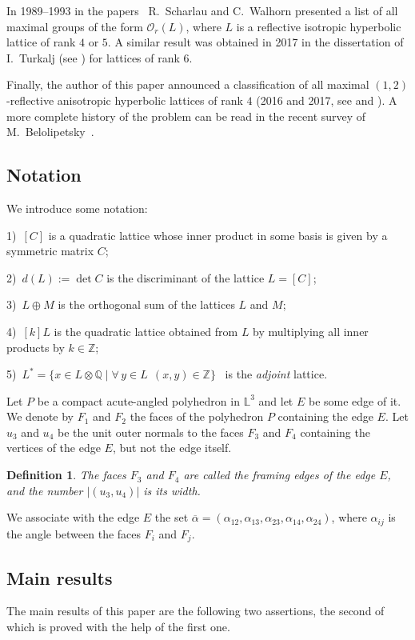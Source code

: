 \documentclass[reqno,12pt]{amsart}
\newtheorem{definition}{\indent Definition}%
\begin{document}
In 1989--1993 in the papers~\cite{Sch89,SW92,Wal93}  R.~Scharlau and C.~Walhorn
presented a list of all maximal groups of the form $\mathcal{O}_r(L)$, where $L$
is a reflective isotropic hyperbolic lattice of rank $4$ or $5$.
A similar result was obtained in 2017 in the dissertation of I.~Turkalj (see  \cite{Tur17})
for lattices of rank $6$.

Finally, the author of this paper announced a classification of all maximal
$(1{,}2)$-reflective anisotropic hyperbolic lattices of rank $4$ (2016 and
2017, see \cite{Bog16} and \cite{Bog17}). A more complete history of the problem
 can be read in the recent survey of M.~Belolipetsky~\cite{Bel16}.



\subsection{Notation}
\label{ss1.2}
We introduce some notation:

1)~$[C]$ is a quadratic lattice whose inner product in some
basis is given by a symmetric matrix $C$;

2)~$d(L) := \det C$ is the discriminant of the lattice $L = [C]$;

3)~$L \oplus M$ is the orthogonal sum of the lattices $L$ and $M$;

4)~$[k]L$ is the quadratic lattice obtained from $L$ by multiplying all inner
products by $k \in \mathbb{Z}$;

5)~$L^*=\{x \in L \otimes \mathbb{Q} \mid \forall\, y \in L \ \ (x, y) \in
\mathbb{Z}\}$~ is the \textit{adjoint} lattice.

Let $P$ be a compact acute-angled polyhedron in $\mathbb{L}^3$ and
let $E$ be some edge of it.
We denote by $F_1$ and $F_2$ the faces of the polyhedron $P$
containing the edge $E$. Let
 $u_3$ and $u_4$ be the unit outer
normals to the faces $F_3$ and $F_4$ containing the vertices of the edge $E$,
but not the edge itself.

\begin{definition}
\label{d1.1}
The faces $F_3$ and $F_4$ are called the framing edges of the edge $ E $,
and the number $|(u_3, u_4)|$ is its width.
\end{definition}

We associate with the edge $E$ the
set $\overline \alpha = (\alpha_{12}, \alpha_{13}, \alpha_{23}, \alpha_{14}, \alpha_{24})$,
where $\alpha_{ij}$ is the angle between the faces $F_i$ and $F_j$.


\subsection{Main results}
\label{ss1.3}
The main results of this paper are the following two assertions, the second
of which is proved with the help of the first one.
\end{document}
